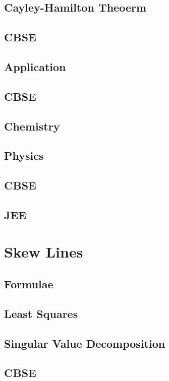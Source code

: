 \documentclass[journal]{IEEEtran}
\begin{document}
\subsection{Cayley-Hamilton Theoerm}

\subsection{CBSE}

\subsection{Application}

\subsection{CBSE}

\subsection{Chemistry}

\subsection{Physics}

\subsection{CBSE}

\subsection{JEE}

\newpage
\section{Skew Lines}
\subsection{Formulae}

\subsection{Least Squares}

\subsection{Singular Value Decomposition}

\subsection{CBSE}

\newpage
\end{document}
